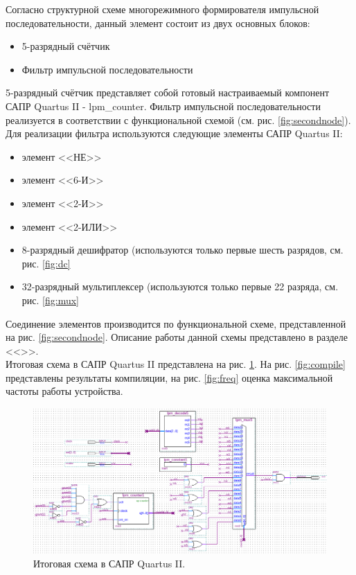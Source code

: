 Согласно структурной схеме многорежимного формирователя импульсной последовательности, данный элемент состоит из двух основных блоков:
\begin{itemize}
\item 5-разрядный счётчик
\item Фильтр импульсной последовательности
\end{itemize}

5-разрядный счётчик представляет собой готовый настраиваемый компонент САПР Quartus II - lpm\_counter. Фильтр импульсной последовательности реализуется в соответствии с функциональной схемой (см. рис. \ref{fig:secondnode}). Для реализации фильтра используются следующие элементы САПР Quartus II:
\begin{itemize}
\item элемент <<НЕ>>
\item элемент <<6-И>>
\item элемент <<2-И>>
\item элемент <<2-ИЛИ>>
\item 8-разрядный дешифратор (используются только первые шесть разрядов, см. рис. \ref{fig:dc}
\item 32-разрядный мультиплексер (используются только первые 22 разряда, см. рис. \ref{fig:mux}
\end{itemize}

\noindent Соединение элементов производится по функциональной схеме, представленной на рис. \ref{fig:secondnode}. Описание работы данной схемы представлено в разделе <<>>.\\
Итоговая схема в САПР Quartus II представлена на рис. \ref{fig:finalscheme}. На рис. \ref{fig:compile} представлены результаты компиляции, на рис. \ref{fig:freq} оценка максимальной частоты работы устройства.

\begin{figure}
  \begin{center}
    \includegraphics[scale=0.65]{./final-scheme.png}
    \caption{Итоговая схема в САПР Quartus II.}
    \label{fig:finalscheme}
  \end{center}
\end{figure}


